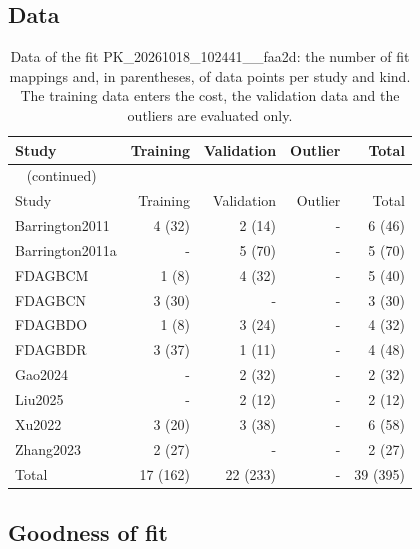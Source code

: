 \subsection{Data}

\begin{longtable}{lrrrr}
\caption{Data of the fit PK\_20261018\_102441\_\_faa2d: the number of fit mappings and, in parentheses, of data points per study and kind. The training data enters the cost, the validation data and the outliers are evaluated only.}\label{tab:data:PK_20261018_102441__faa2d} \\
\toprule
Study & Training & Validation & Outlier & Total \\
\midrule
\endfirsthead
\multicolumn{5}{l}{\small\tablename~\thetable{} (continued)} \\
\toprule
Study & Training & Validation & Outlier & Total \\
\midrule
\endhead
\bottomrule
\endlastfoot
Barrington2011 & 4 (32) & 2 (14) & - & 6 (46) \\
Barrington2011a & - & 5 (70) & - & 5 (70) \\
FDAGBCM & 1 (8) & 4 (32) & - & 5 (40) \\
FDAGBCN & 3 (30) & - & - & 3 (30) \\
FDAGBDO & 1 (8) & 3 (24) & - & 4 (32) \\
FDAGBDR & 3 (37) & 1 (11) & - & 4 (48) \\
Gao2024 & - & 2 (32) & - & 2 (32) \\
Liu2025 & - & 2 (12) & - & 2 (12) \\
Xu2022 & 3 (20) & 3 (38) & - & 6 (58) \\
Zhang2023 & 2 (27) & - & - & 2 (27) \\
Total & 17 (162) & 22 (233) & - & 39 (395) \\
\end{longtable}

\subsection{Goodness of fit}

